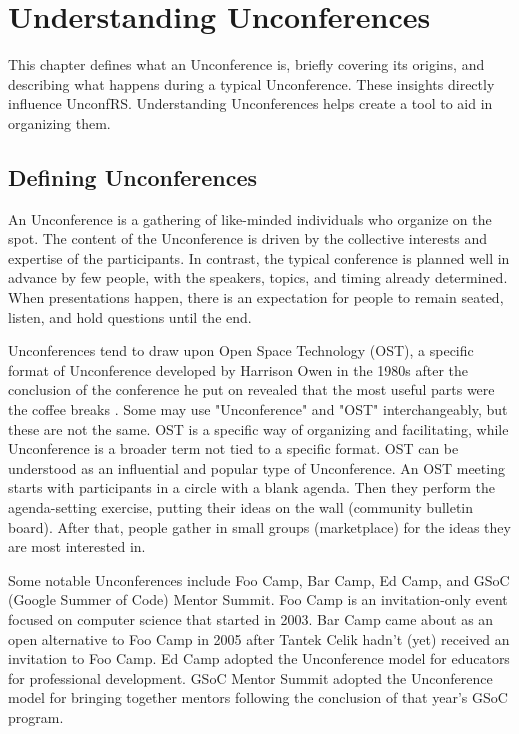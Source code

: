 %
%
\chapter{Understanding Unconferences}
This chapter defines what an Unconference is, briefly covering its origins, and describing what happens during a typical Unconference. These insights directly influence UnconfRS. Understanding Unconferences helps create a tool to aid in organizing them.

\section{Defining Unconferences}
An Unconference is a gathering of like-minded individuals who organize on the spot. The content of the Unconference is driven by the collective interests and expertise of the participants\cite{budd2015, duke2022}. In contrast, the typical conference is planned well in advance by few people, with the speakers, topics, and timing already determined. When presentations happen, there is an expectation for people to remain seated, listen, and hold questions until the end.

Unconferences tend to draw upon Open Space Technology (OST), a specific format of Unconference developed by Harrison Owen in the 1980s after the conclusion of the conference he put on revealed that the most useful parts were the coffee breaks \cite{harrison2008}. Some may use "Unconference" and "OST" interchangeably, but these are not the same. OST is a specific way of organizing and facilitating, while Unconference is a broader term not tied to a specific format. OST can be understood as an influential and popular type of Unconference. An OST meeting starts with participants in a circle with a blank agenda. Then they perform the agenda-setting exercise, putting their ideas on the wall (community bulletin board). After that, people gather in small groups (marketplace) for the ideas they are most interested in.\cite{harrison2008}

Some notable Unconferences include Foo Camp, Bar Camp, Ed Camp, and GSoC (Google Summer of Code) Mentor Summit. Foo Camp is an invitation-only event focused on computer science that started in 2003\cite{oreilly2018}. Bar Camp came about as an open alternative to Foo Camp in 2005 after Tantek Celik hadn't (yet) received an invitation to Foo Camp\cite{celik2006}. Ed Camp adopted the Unconference model for educators for professional development\cite{edcamp2011}. GSoC Mentor Summit adopted the Unconference model for bringing together mentors following the conclusion of that year's GSoC program\cite{googleblog2006}.

